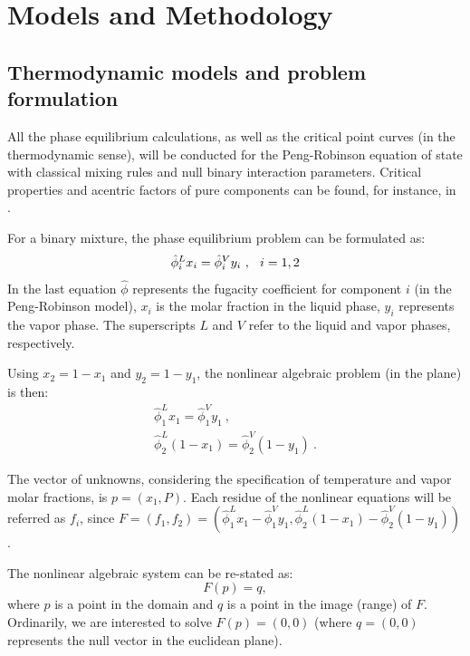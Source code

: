 \documentclass{article}
\theoremstyle{definition}
\theoremstyle{remark}
\begin{document}
\section{Models and Methodology}

\subsection{Thermodynamic models and problem formulation}

All the phase equilibrium calculations, as well as the critical point
 curves (in the thermodynamic sense), will be conducted for
  the Peng-Robinson equation of state with classical mixing rules and 
  null binary interaction parameters. 
  Critical properties and acentric factors of pure components can be found, for instance, in \cite{ireme}.

For a binary mixture, the phase equilibrium problem can be formulated as:
\begin{eqnarray}
\hat{\phi}_i^L x_i = \hat{\phi}_i^V y_i\ ,  \hspace{0.1in} i = 1,2
\end{eqnarray}
In the last equation $\hat{\phi}$ represents the fugacity coefficient for component $i$ (in the Peng-Robinson model), $x_i$ is the molar fraction in the liquid phase, $y_i$ represents the vapor phase. The superscripts $L$ and $V$ refer to the liquid and vapor phases, respectively.

Using $x_2 = 1 - x_1$ and $y_2 = 1 - y_1$, the nonlinear algebraic problem (in the plane) is then:
\begin{subequations}
\begin{eqnarray}
\hat{\phi}_1^L x_1 = \hat{\phi}_1^V y_1 \ , \\
\hat{\phi}_2^L (1-x_1) = \hat{\phi}_2^V (1-y_1)\ .
\end{eqnarray}
\end{subequations}

The vector of unknowns, considering the specification of temperature and vapor molar fractions, is $p = (x_1,P)$. Each residue of the nonlinear equations will be referred as $f_i$, since 
$F = (f_1,f_2)=(\hat{\phi}_1^L x_1 - \hat{\phi}_1^V y_1,\hat{\phi}_2^L (1-x_1) - \hat{\phi}_2^V (1-y_1))$.

The nonlinear algebraic system can be re-stated as:
\begin{equation}
F(p) = q,
\end{equation}
where $p$ is a point in the domain and $q$ is a point in the image 
(range) of $F$. Ordinarily, we are interested to solve 
$F(p) = (0,0)$ (where $q=(0,0)$ represents the null vector in the 
euclidean plane).
\end{document}
